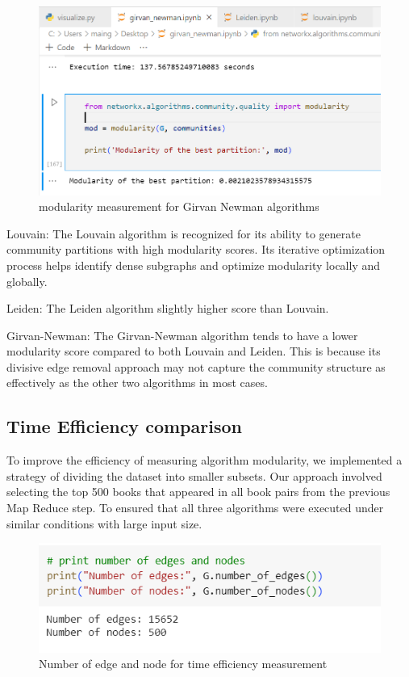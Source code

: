 \begin{figure}[H]
    \centering
    \includegraphics[width=\textwidth]{image/modularity measure girvan.png}
    \caption{modularity measurement for Girvan Newman algorithms}
\end{figure}

Louvain: The Louvain algorithm is recognized for its ability to generate community partitions with high modularity scores. Its iterative optimization process helps identify dense subgraphs and optimize modularity locally and globally.

Leiden: The Leiden algorithm slightly higher score than Louvain.

Girvan-Newman: The Girvan-Newman algorithm tends to have a lower modularity score compared to both Louvain and Leiden. This is because its divisive edge removal approach may not capture the community structure as effectively as the other two algorithms in most cases.

\subsection{Time Efficiency comparison}
To improve the efficiency of measuring algorithm modularity, we implemented a strategy of dividing the dataset into smaller subsets. Our approach involved selecting the top 500 books that appeared in all book pairs from the previous Map Reduce step. To ensured that all three algorithms were executed under similar conditions with large input size.

\begin{figure}[H]
    \centering
    \includegraphics[width=\textwidth]{image/timetest.png}
    \caption{Number of edge and node for time efficiency measurement}
\end{figure}

